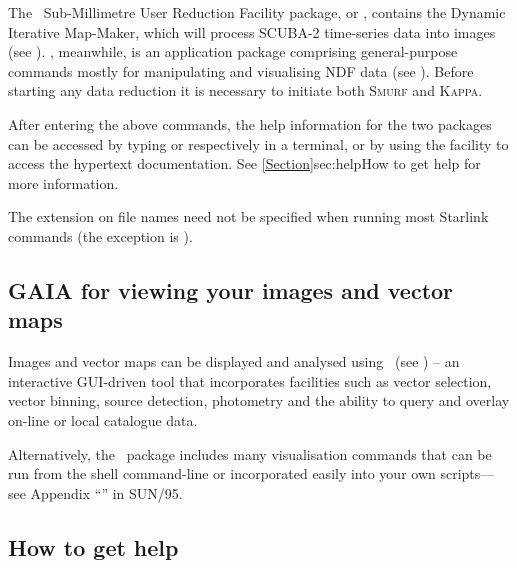 The \starlink\ Sub-Millimetre User Reduction Facility package, or \smurf,
contains the Dynamic Iterative Map-Maker, which will process
SCUBA-2 time-series data into images (see \smurfsun). \Kappa, meanwhile, is
an application package comprising general-purpose commands mostly for
manipulating and visualising NDF data (see \kappasun). Before starting
any data reduction it is necessary to initiate both \textsc{Smurf} and
\textsc{Kappa}.

\begin{terminalv}
\end{terminalv}

After entering the above commands, the help information
for the two packages can be accessed by typing  or
 respectively in a terminal, or by using the
 facility to access the hypertext documentation. See
\cref{Section}{sec:help}{How to get help} for more information.



\begin{tip}
The  extension on file names need not be specified when running most
Starlink commands (the exception is \picard).
\end{tip}


\subsection{GAIA for viewing your images and vector maps}
Images and vector maps can be displayed and analysed using \gaia\ (see
\gaiasun) -- an interactive GUI-driven tool that incorporates facilities
such as vector selection, vector binning, source detection, photometry
and the ability to query and overlay on-line or local catalogue data.
\begin{terminalv}
\end{terminalv}

Alternatively, the \Kappa\ package includes many visualisation commands
that can be run from the shell command-line or incorporated easily into your
own scripts---see Appendix ``''
in SUN/95.


\subsection{How to get help}
\label{sec:help}

